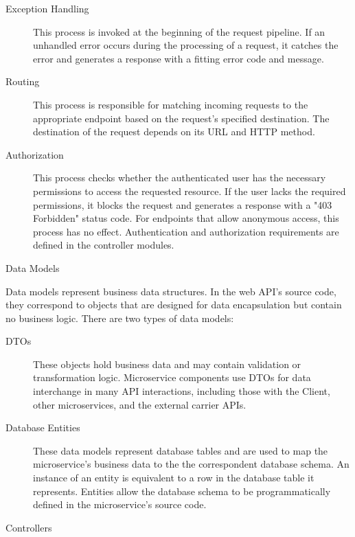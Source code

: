 \documentclass[12pt, reqno]{amsbook}
\makeatletter
\def\subsection{\@startsection{subsection}{2}%
      \z@{.5\linespacing\@plus.7\linespacing}{.25\linespacing}%
      {\normalfont\bfseries\flushleft}}
\theoremstyle{definition}
\theoremstyle{definition}
\numberwithin{section}{chapter}
\numberwithin{table}{chapter}
\numberwithin{figure}{chapter}
\makeatother
\begin{document}
\begin{description}
  \item[Exception Handling] This process is invoked at the beginning of the request pipeline. If an unhandled error occurs during the processing of a request, it catches the error and generates a response with a fitting error code and message.
  \item[Routing] This process is responsible for matching incoming requests to the appropriate endpoint based on the request's specified destination. The destination of the request depends on its \Ac{URL} and \ac{HTTP} method.
  \item[Authorization] This process checks whether the authenticated user has the necessary permissions to access the requested resource. If the user lacks the required permissions, it blocks the request and generates a response with a "403 Forbidden" status code. For endpoints that allow anonymous access, this process has no effect. Authentication and authorization requirements are defined in the controller modules.
\end{description}

\subsection{Data Models}

Data models represent business data structures. In the web \ac{API}'s source code, they correspond to objects that are designed for data encapsulation but contain no business logic. There are two types of data models:

\begin{description}
  \item[\acp{DTO}] These objects hold business data and may contain validation or transformation logic. Microservice components use \acp{DTO} for data interchange in many \ac{API} interactions, including those with the Client, other microservices, and the external carrier \acp{API}.
  \item[Database Entities] These data models represent database tables and are used to map the microservice's business data to the the correspondent database schema. An instance of an entity is equivalent to a row in the database table it represents. Entities allow the database schema to be programmatically defined in the microservice's source code.
\end{description}

\subsection{Controllers}
\end{document}
